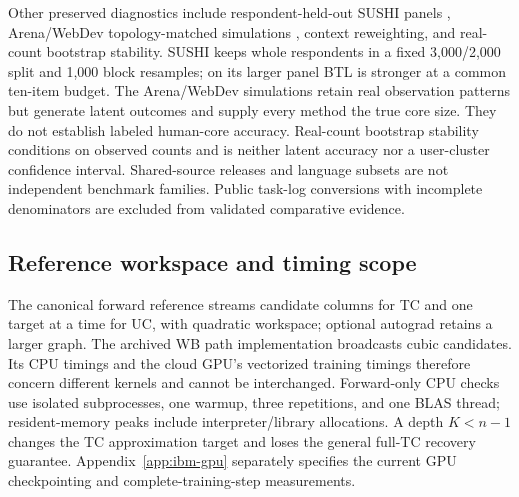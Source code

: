 Other preserved diagnostics include respondent-held-out SUSHI panels \citep{kamishima2009orders,sushidata}, Arena/WebDev topology-matched simulations \citep{chiang2024chatbotarena,arena100data,webdevdata}, context reweighting, and real-count bootstrap stability. SUSHI keeps whole respondents in a fixed 3,000/2,000 split and 1,000 block resamples; on its larger panel BTL is stronger at a common ten-item budget. The Arena/WebDev simulations retain real observation patterns but generate latent outcomes and supply every method the true core size. They do not establish labeled human-core accuracy. Real-count bootstrap stability conditions on observed counts and is neither latent accuracy nor a user-cluster confidence interval. Shared-source releases and language subsets are not independent benchmark families. Public task-log conversions with incomplete denominators are excluded from validated comparative evidence.

\subsection{Reference workspace and timing scope}\label{app:runtime}
The canonical forward reference streams candidate columns for TC and one target at a time for UC, with quadratic workspace; optional autograd retains a larger graph. The archived WB path implementation broadcasts cubic candidates. Its CPU timings and the cloud GPU's vectorized training timings therefore concern different kernels and cannot be interchanged. Forward-only CPU checks use isolated subprocesses, one warmup, three repetitions, and one BLAS thread; resident-memory peaks include interpreter/library allocations. A depth $K<n-1$ changes the TC approximation target and loses the general full-TC recovery guarantee. Appendix~\ref{app:ibm-gpu} separately specifies the current GPU checkpointing and complete-training-step measurements.
